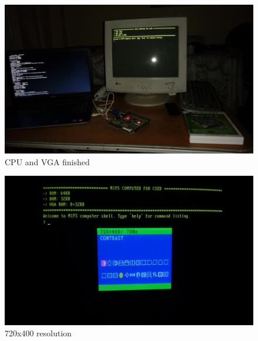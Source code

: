\documentclass[oneside]{book}
\begin{document}
\begin{figure}
\begin{center}
\includegraphics[width=20cm]{res_early1.jpg}
\end{center}
\caption{CPU and VGA finished}
\end{figure}

\begin{figure}
\begin{center}
\includegraphics[width=20cm]{res_early2.jpg}
\end{center}
\caption{720x400 resolution}
\end{figure}
\end{document}
